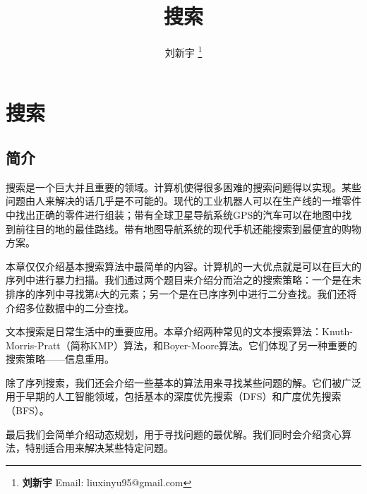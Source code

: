 \documentclass[UTF8]{article}
\begin{document}


\title{搜索}

\author{刘新宇
\thanks{{\bfseries 刘新宇 } \newline
  Email: liuxinyu95@gmail.com \newline}
  }

\maketitle
\fi


\ifx\wholebook\relax
\chapter{搜索}
\fi

\def\includetikz{}

\section{简介}
\label{introduction}

搜索是一个巨大并且重要的领域。计算机使得很多困难的搜索问题得以实现。某些问题由人来解决的话几乎是不可能的。现代的工业机器人可以在生产线的一堆零件中找出正确的零件进行组装；带有全球卫星导航系统GPS的汽车可以在地图中找到前往目的地的最佳路线。带有地图导航系统的现代手机还能搜索到最便宜的购物方案。

本章仅仅介绍基本搜索算法中最简单的内容。计算机的一大优点就是可以在巨大的序列中进行暴力扫描。我们通过两个题目来介绍分而治之的搜索策略：一个是在未排序的序列中寻找第$k$大的元素；另一个是在已序序列中进行二分查找。我们还将介绍多位数据中的二分查找。

文本搜索是日常生活中的重要应用。本章介绍两种常见的文本搜索算法：Knuth-Morris-Pratt（简称KMP）算法，和Boyer-Moore算法。它们体现了另一种重要的搜索策略——信息重用。

除了序列搜索，我们还会介绍一些基本的算法用来寻找某些问题的解。它们被广泛用于早期的人工智能领域，包括基本的深度优先搜索（DFS）和广度优先搜索（BFS）。

最后我们会简单介绍动态规划，用于寻找问题的最优解。我们同时会介绍贪心算法，特别适合用来解决某些特定问题。
\end{document}

